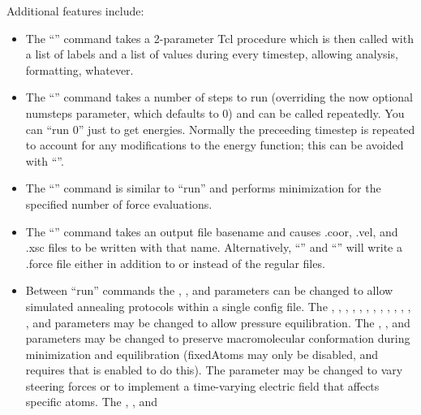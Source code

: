 Additional features include:
\begin{itemize}
 \item The ``'' command takes a 2-parameter Tcl procedure which
    is then called with a list of labels and a list of values during
    every timestep, allowing analysis, formatting, whatever.
 \item The ``'' command takes a number of steps to run (overriding the
    now optional numsteps parameter, which defaults to 0) and can be
    called repeatedly.  You can ``run 0'' just to get energies.
    Normally the preceeding timestep is repeated to account for any modifications to the
    energy function; this can be avoided with ``''.
 \item The ``'' command is similar to ``run'' and performs
    minimization for the specified number of force evaluations.
 \item The ``'' command takes an output file basename and causes
    .coor, .vel, and .xsc files to be written with that name.
    Alternatively, ``'' and
    ``'' will write a .force file
    either in addition to or instead of the regular files.
 \item Between ``run'' commands the ,
    , and
     parameters can be changed to allow simulated
    annealing protocols within a single config file.
    The , ,
    , ,
    , ,
    , ,
    , ,
    , ,
    , and
    parameters may be changed to allow pressure equilibration.
    The , , and
     parameters may be
    changed to preserve macromolecular conformation during minimization and
    equilibration (fixedAtoms may only be disabled, and requires that
     is enabled to do this).
    The  parameter may be changed to vary steering forces
    or to implement a time-varying electric field that affects specific atoms.
    The , , and

\end{itemize}
